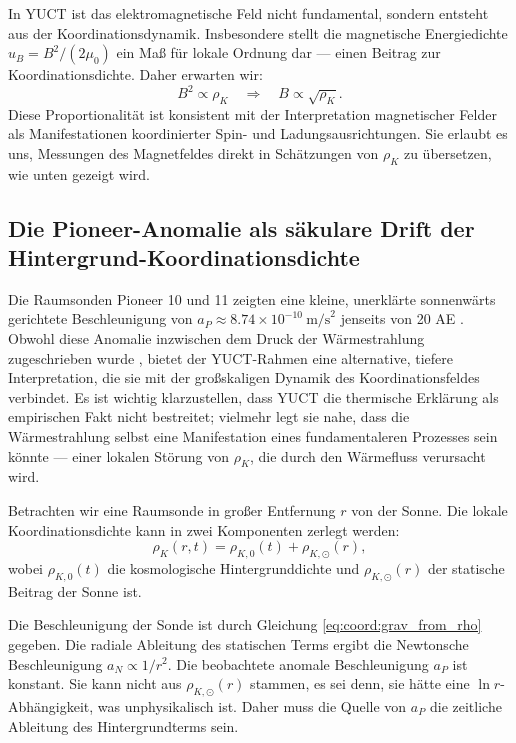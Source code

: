 \documentclass[12pt,a4paper]{article}
\theoremstyle{remark}
\begin{document}
	In YUCT ist das elektromagnetische Feld nicht fundamental, sondern entsteht aus der Koordinationsdynamik. Insbesondere stellt die magnetische Energiedichte $u_B = B^2/(2\mu_0)$ ein Maß für lokale Ordnung dar — einen Beitrag zur Koordinationsdichte. Daher erwarten wir:
	\begin{equation}
		B^2 \propto \rho_K \quad \Longrightarrow \quad B \propto \sqrt{\rho_K}.
		\label{eq:coord:B_rho}
	\end{equation}
	Diese Proportionalität ist konsistent mit der Interpretation magnetischer Felder als Manifestationen koordinierter Spin- und Ladungsausrichtungen. Sie erlaubt es uns, Messungen des Magnetfeldes direkt in Schätzungen von $\rho_K$ zu übersetzen, wie unten gezeigt wird.
	
	\subsection{Die Pioneer-Anomalie als säkulare Drift der Hintergrund-Koordinationsdichte}
	\label{subsec:coord:pioneer}
	
	Die Raumsonden Pioneer 10 und 11 zeigten eine kleine, unerklärte sonnenwärts gerichtete Beschleunigung von $a_P \approx 8.74 \times 10^{-10}\ \text{m/s}^2$ jenseits von 20 AE \cite{Anderson1998}. Obwohl diese Anomalie inzwischen dem Druck der Wärmestrahlung zugeschrieben wurde \cite{Turyshev2012}, bietet der YUCT-Rahmen eine alternative, tiefere Interpretation, die sie mit der großskaligen Dynamik des Koordinationsfeldes verbindet. Es ist wichtig klarzustellen, dass YUCT die thermische Erklärung als empirischen Fakt nicht bestreitet; vielmehr legt sie nahe, dass die Wärmestrahlung selbst eine Manifestation eines fundamentaleren Prozesses sein könnte — einer lokalen Störung von $\rho_K$, die durch den Wärmefluss verursacht wird.
	
	Betrachten wir eine Raumsonde in großer Entfernung $r$ von der Sonne. Die lokale Koordinationsdichte kann in zwei Komponenten zerlegt werden:
	\begin{equation}
		\rho_K(r,t) = \rho_{K,0}(t) + \rho_{K,\odot}(r),
		\label{eq:coord:rho_decomp}
	\end{equation}
	wobei $\rho_{K,0}(t)$ die kosmologische Hintergrunddichte und $\rho_{K,\odot}(r)$ der statische Beitrag der Sonne ist.
	
	Die Beschleunigung der Sonde ist durch Gleichung \eqref{eq:coord:grav_from_rho} gegeben. Die radiale Ableitung des statischen Terms ergibt die Newtonsche Beschleunigung $a_N \propto 1/r^2$. Die beobachtete anomale Beschleunigung $a_P$ ist konstant. Sie kann nicht aus $\rho_{K,\odot}(r)$ stammen, es sei denn, sie hätte eine $\ln r$-Abhängigkeit, was unphysikalisch ist. Daher muss die Quelle von $a_P$ die zeitliche Ableitung des Hintergrundterms sein.
	
\end{document}

